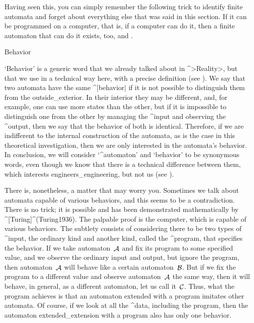 Having seen this, you can simply remember the following trick to
identify finite automata and forget about everything else that was said
in this section. If it can be programmed on a computer, that is, if a
computer can do it, then a finite automaton that can do it exists, too,
and .


\Section Behavior

`Behavior' is a generic word that we already talked about in ^>Reality>,
but that we use in a technical way here, with a precise definition (see
).
%
We say that two automata have the same ^|behavior| if it is not possible
to distinguish them from the outside_{exterior}. In their interior they
may be different, and, for example, one can use more states than the
other, but if it is impossible to distinguish one from the other by
managing the ^{input} and observing the ^{output}, then we say that the
behavior of both is identical. Therefore, if we are indifferent to the
internal construction of the automata, as is the case in this
theoretical investigation, then we are only interested in the automata's
behavior. In conclusion, we will consider `^{automaton}' and `behavior'
to be synonymous words, even though we know that there is a technical
difference between them, which interests engineers_{engineering}, but
not us (see ).

There is, nonetheless, a matter that may worry you. %
Sometimes we talk about automata capable of various behaviors, and this
seems to be a contradiction. There is no trick; it is possible and has
been demonstrated mathematically by ^[Turing]^(Turing1936). The palpable
proof is the computer, which is capable of various behaviors. The
subtlety consists of considering there to be two types of ^{input}, the
ordinary kind and another kind, called the ^{program}, that specifies
the behavior. If we take automaton~$\aut A$ and fix its program to some
specified value, and we observe the ordinary input and output, but
ignore the program, then automaton~$\aut A$ will behave like a certain
automaton~$\aut B$. But if we fix the program to a different value and
observe automaton~$\aut A$ the same way, then it will behave, in
general, as a different automaton, let us call it~$\aut C$. Thus, what
the program achieves is that an automaton extended with a program
imitates other automata. Of course, if we look at all the ^{data},
including the program, then the automaton extended_{extension} with a
program also has only one behavior.


\endinput
